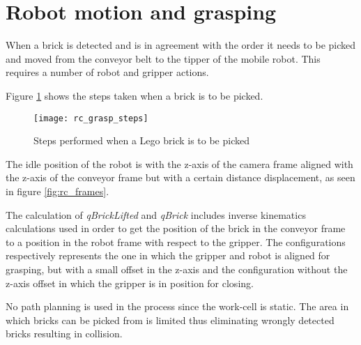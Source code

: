 \section{Robot motion and grasping}
\label{sec:rc_grasp}
When a brick is detected and is in agreement with the order it needs to be picked and moved from the conveyor belt to the tipper of the mobile robot. This requires a number of robot and gripper actions. 

Figure \ref{fig:rc_grasp} shows the steps taken when a brick is to be picked. 

	\begin{figure}[H]
		\centering
	    \texttt{[image: rc\_grasp\_steps]}
	    \caption{Steps performed when a Lego brick is to be picked}
		\label{fig:rc_grasp}
	\end{figure}
		
The idle position of the robot is with the z-axis of the camera frame aligned with the z-axis of the conveyor frame but with a certain distance displacement, as seen in figure \ref{fig:rc_frames}.

The calculation of \textit{qBrickLifted} and \textit{qBrick} includes inverse kinematics calculations used in order to get the position of the brick in the conveyor frame to a position in the robot frame with respect to the gripper. The configurations respectively represents the one in which the gripper and robot is aligned for grasping, but with a small offset in the z-axis and the configuration without the z-axis offset in which the gripper is in position for closing.  

No path planning is used in the process since the work-cell is static. The area in which bricks can be picked from is limited thus eliminating wrongly detected bricks resulting in collision. 

